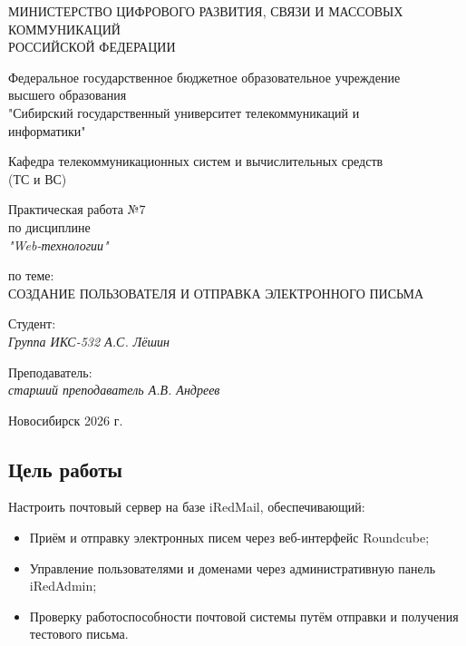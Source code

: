 \documentclass[a4paper,14pt,oneside,openany]{memoir}
\begin{document}
\thispagestyle{empty}

\begin{center}
    МИНИСТЕРСТВО ЦИФРОВОГО РАЗВИТИЯ, СВЯЗИ И МАССОВЫХ \\ КОММУНИКАЦИЙ \\ РОССИЙСКОЙ ФЕДЕРАЦИИ

    \vspace{20pt}

    Федеральное государственное бюджетное образовательное учреждение \\ высшего образования \\
    "Сибирский государственный университет телекоммуникаций и \\ информатики"

    \vspace{20pt}

    Кафедра телекоммуникационных систем и вычислительных средств \\ (ТС и ВС)
\end{center}

\vfill

\begin{center}
    Практическая работа №7 \\
    по дисциплине \\
    \textit{"Web-технологии"}

    \vspace{20pt}

    по теме: \\
    \uppercase{Создание пользователя и отправка электронного письма}
\end{center}

\vfill

\noindent Студент: \\
\textit{Группа ИКС-532 \hfill А.С. Лёшин}

\vspace{20pt}

\noindent Преподаватель: \\
\textit{старший преподаватель \hfill А.В. Андреев}

\vfill

\begin{center}
    Новосибирск 2026 г.
\end{center}

\newpage
\setcounter{page}{2}
\OnehalfSpacing*

\subsection*{Цель работы}
Настроить почтовый сервер на базе iRedMail, обеспечивающий:
\begin{itemize}
    \item Приём и отправку электронных писем через веб-интерфейс Roundcube;
    \item Управление пользователями и доменами через административную панель iRedAdmin;
    \item Проверку работоспособности почтовой системы путём отправки и получения тестового письма.
\end{itemize}
\end{document}
